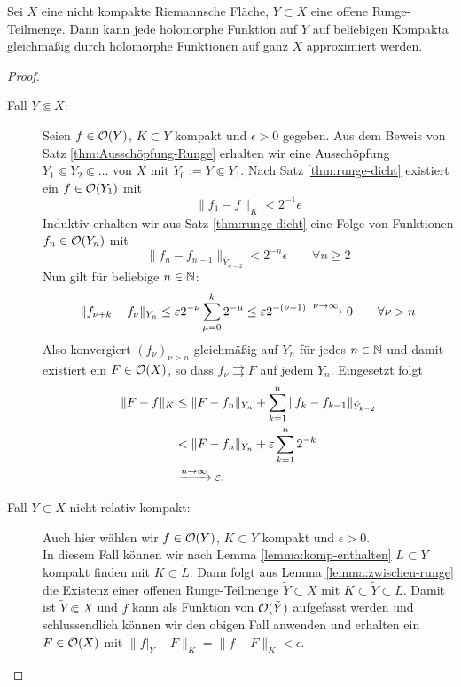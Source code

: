 \begin{thm}
  Sei $X$ eine nicht kompakte Riemannsche Fläche, $Y \subset X$ eine
  offene Runge-Teilmenge.
  Dann kann jede holomorphe Funktion auf $Y$ auf beliebigen Kompakta
  gleichmäßig durch holomorphe Funktionen auf ganz $X$ approximiert werden.
\end{thm}

\begin{proof}
  \begin{description}
  \item[Fall $Y \Subset X$:] Seien $f \in \mathcal{O}(Y)$, $K \subset Y$
    kompakt und $\epsilon > 0$ gegeben. 
    Aus dem Beweis von Satz \ref{thm:Ausschöpfung-Runge} erhalten wir
    eine Ausschöpfung$Y_1
    \Subset Y_2 \Subset \dots$ von $X$ mit $Y_0 := Y \Subset Y_1$. 
    Nach Satz \ref{thm:runge-dicht} existiert ein $f \in \mathcal{O}(Y_1)$
    mit
    \[
    \|f_1 - f\|_K < 2^{-1} \epsilon
    \]
    Induktiv erhalten wir aus Satz \ref{thm:runge-dicht} eine Folge
    von Funktionen $f_n \in \mathcal{O}(Y_n)$ mit
    \[
    \|f_n - f_{n-1}\|_{\bar Y_{n-2}} < 2^{-n} \epsilon \qquad \forall
    n \geq 2
    \]
    Nun gilt für beliebige $n \in \mathbb{N}$:
    \[
    \|f_{\nu + k} - f_{\nu} \|_{Y_n} \leq \varepsilon 2^{-\nu} \sum_{\mu
      = 0}^k 2^{-\mu} \leq  \varepsilon 2^{-(\nu+1)} \xrightarrow{\nu \rightarrow
      \infty} 0 \qquad \forall \nu > n
    \]
    Also konvergiert $(f_\nu)_{\nu > n}$ gleichmäßig auf $Y_n$ für
    jedes $n \in \mathbb{N}$ und damit existiert ein $F \in \mathcal{O}(X)$, so dass
    $f_\nu \rightrightarrows F$ auf jedem $Y_n$. Eingesetzt folgt
    \begin{align*}
      \|F - f\|_K & \leq \|F - f_n\|_{Y_n} + \sum_{k=1}^n \|f_k -
      f_{k-1}\|_{\bar Y_{k-2}} \\
      & < \|F - f_n \|_{Y_n} + \varepsilon \sum_{k=1}^n 2^{-k} \\
      & \xrightarrow{n \rightarrow \infty} \varepsilon.
    \end{align*}
  \item[Fall $Y \subset X$ nicht relativ kompakt:] Auch hier wählen
    wir $f \in \mathcal{O}(Y)$, $K \subset Y$ kompakt und $\epsilon > 0$. \\
    In diesem Fall können wir nach Lemma \ref{lemma:komp-enthalten}  $L \subset Y$ kompakt finden mit $K \subset
    \mathring L$. Dann folgt aus Lemma \ref{lemma:zwischen-runge} die Existenz einer
    offenen Runge-Teilmenge
    $\tilde Y \subset X$ mit $K \subset \tilde Y \subset L$. 
    Damit ist $\tilde Y \Subset X$ und $f$ kann als Funktion von
    $\mathcal{O}(\tilde Y)$ aufgefasst werden und schlussendlich können wir
    den obigen Fall anwenden und erhalten ein $F \in \mathcal{O}(X)$ mit
    $\|f|_{\tilde Y} - F\|_K = \|f - F\|_K < \epsilon$.
  \end{description}
\end{proof}

